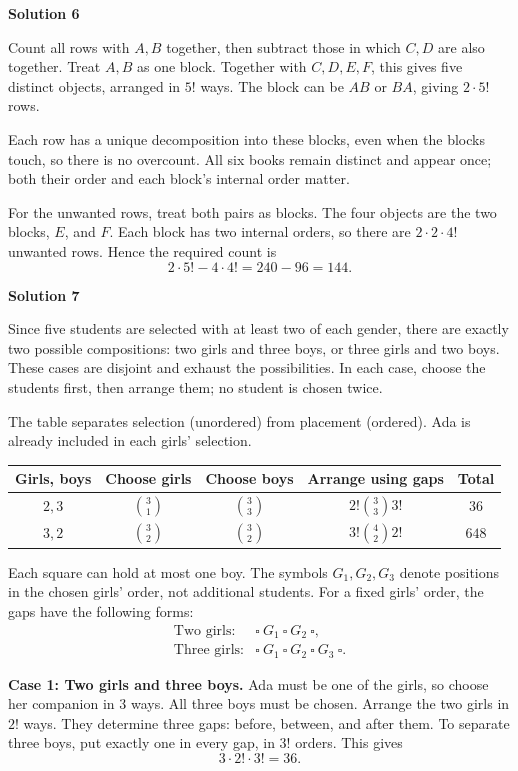 \documentclass[11pt]{article}
\newcommand{\solution}[1]{%
  \par\Needspace{5\baselineskip}\addvspace{.8\baselineskip}%
  {\large\bfseries Solution #1\par}\nopagebreak[4]}
\begin{document}
\solution{6}
Count all rows with $A,B$ together, then subtract those in which $C,D$
are also together. Treat $A,B$ as one block. Together with $C,D,E,F$,
this gives five distinct objects, arranged in $5!$ ways. The block can
be $AB$ or $BA$, giving $2\cdot5!$ rows.

Each row has a unique decomposition into these blocks, even when the
blocks touch, so there is no overcount. All six books remain distinct
and appear once; both their order and each block's internal order matter.

For the unwanted rows, treat both pairs as blocks. The four objects
are the two blocks, $E$, and $F$. Each block has two internal orders,
so there are $2\cdot2\cdot4!$ unwanted rows. Hence the required count is
\[
2\cdot5!-4\cdot4!=240-96=\boxed{144}.
\]

 \vspace{-10mm}
\solution{7}
Since five students are selected with at least two of each gender, there
are exactly two possible compositions: two girls and three boys, or
three girls and two boys. These cases are disjoint and exhaust the possibilities.
In each case, choose the students first, then arrange them; no student
is chosen twice.

The table separates selection (unordered) from placement (ordered).
Ada is already included in each girls' selection.
\begin{center}
\renewcommand{\arraystretch}{1.2}
\begin{tabular}{@{}ccccc@{}}
\toprule
Girls, boys & Choose girls & Choose boys & Arrange using gaps & Total \\
\midrule
$2,3$ & $\binom31$ & $\binom33$ & $2!\binom33 3!$ & $36$ \\
$3,2$ & $\binom32$ & $\binom32$ & $3!\binom42 2!$ & $648$ \\
\bottomrule
\end{tabular}
\end{center}
Each square can hold at most one boy. The symbols $G_1,G_2,G_3$ denote
positions in the chosen girls' order, not additional students.
For a fixed girls' order, the gaps have the following forms:
\[
\begin{array}{ll}
\text{Two girls:}&\square\ G_1\ \square\ G_2\ \square,\\[4pt]
\text{Three girls:}&\square\ G_1\ \square\ G_2\ \square\ G_3\ \square.
\end{array}
\]


\textbf{Case 1: Two girls and three boys.}
Ada must be one of the girls, so choose her companion in $3$ ways.
All three boys must be chosen. Arrange the two girls in $2!$ ways.
They determine three gaps: before, between, and after them. To separate
three boys, put exactly one in every gap, in $3!$ orders. This gives
\[
3\cdot2!\cdot3!=36.
\]
\end{document}
